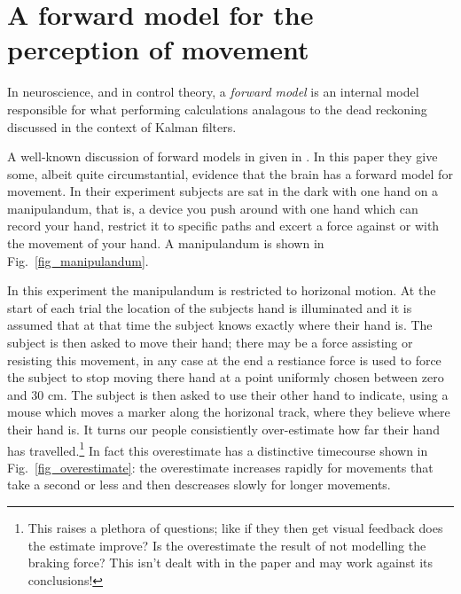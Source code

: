 \documentclass[12pt]{article}
\begin{document}
\section*{A forward model for the perception of movement}

In neuroscience, and in control theory, a \textsl{forward model} is an
internal model responsible for what performing calculations analagous
to the dead reckoning discussed in the context of Kalman filters.

A well-known discussion of forward models in given in
\cite{WolpertEtAl1995}. In this paper they give some, albeit quite
circumstantial, evidence that the brain has a forward model for
movement. In their experiment subjects are sat in the dark with one
hand on a manipulandum, that is, a device you push around with one
hand which can record your hand, restrict it to specific paths and
excert a force against or with the movement of your hand. A
manipulandum is shown in Fig.~\ref{fig_manipulandum}.

In this experiment the manipulandum is restricted to horizonal
motion. At the start of each trial the location of the subjects hand
is illuminated and it is assumed that at that time the subject knows
exactly where their hand is. The subject is then asked to move their
hand; there may be a force assisting or resisting this movement, in
any case at the end a restiance force is used to force the subject to
stop moving there hand at a point uniformly chosen between zero and 30
cm.  The subject is then asked to use their other hand to indicate,
using a mouse which moves a marker along the horizonal track, where
they believe where their hand is. It turns our people consistiently
over-estimate how far their hand has travelled.\footnote{This raises a
  plethora of questions; like if they then get visual feedback does
  the estimate improve? Is the overestimate the result of not
  modelling the braking force? This isn't dealt with in the paper and
  may work against its conclusions!}  In fact this overestimate has a
distinctive timecourse shown in Fig.~\ref{fig_overestimate}: the
overestimate increases rapidly for movements that take a second or
less and then descreases slowly for longer movements.
\end{document}
